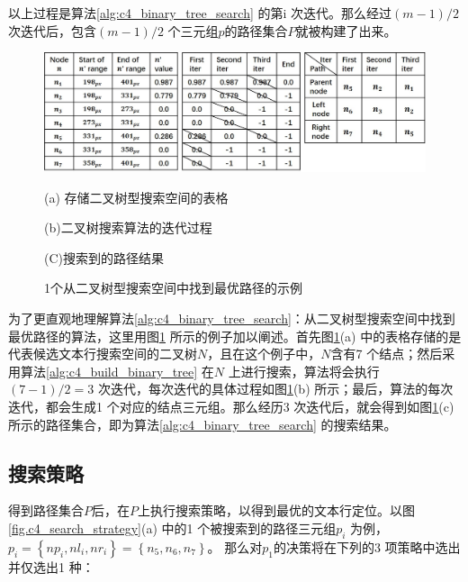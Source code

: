         以上过程是算法\ref{alg:c4_binary_tree_search} 的第i 次迭代。那么经过$(m-1)/2$次迭代后，包含$(m-1)/2$ 个三元组$p$的路径集合$P$就被构建了出来。

        \begin{figure}[!h]
        \centering
        \includegraphics[width=\textwidth]{./figures/c4_bianry_tree_search.jpg}
        \begin{minipage}[t]{0.33\linewidth}
        \centerline{\small (a) 存储二叉树型搜索空间的表格}
        \end{minipage}
        \begin{minipage}[t]{0.33\linewidth}
        \centerline{\small(b)二叉树搜索算法的迭代过程}
        \end{minipage}
        \begin{minipage}[t]{0.26\linewidth}
        \centerline{\small(C)搜索到的路径结果}
        \end{minipage}
        \caption{1个从二叉树型搜索空间中找到最优路径的示例}
        \label{fig.c4_bianry_tree_search}
        \end{figure}

        为了更直观地理解算法\ref{alg:c4_binary_tree_search}：从二叉树型搜索空间中找到最优路径的算法，这里用图\ref{fig.c4_bianry_tree_search} 所示的例子加以阐述。首先图\ref{fig.c4_bianry_tree_search}(a) 中的表格存储的是代表候选文本行搜索空间的二叉树$N$，且在这个例子中，$N$含有7 个结点；然后采用算法\ref{alg:c4_build_binary_tree} 在$N$ 上进行搜索，算法将会执行$(7-1)/2=3$ 次迭代，每次迭代的具体过程如图\ref{fig.c4_bianry_tree_search}(b) 所示；最后，算法的每次迭代，都会生成1 个对应的结点三元组。那么经历3 次迭代后，就会得到如图\ref{fig.c4_bianry_tree_search}(c) 所示的路径集合，即为算法\ref{alg:c4_binary_tree_search} 的搜索结果。

        \subsection{搜索策略}
        \label{sec.c4_searching strategies}

        得到路径集合$P$后，在$P$上执行搜索策略，以得到最优的文本行定位。以图\ref{fig.c4_search_strategy}(a) 中的1 个被搜索到的路径三元组$p_i$ 为例，$p_i=\left\{np_i,nl_i,nr_i\right\}=\left\{n_5,n_6,n_7\right\}$。 那么对$p_1$的决策将在下列的3 项策略中选出并仅选出1 种：

